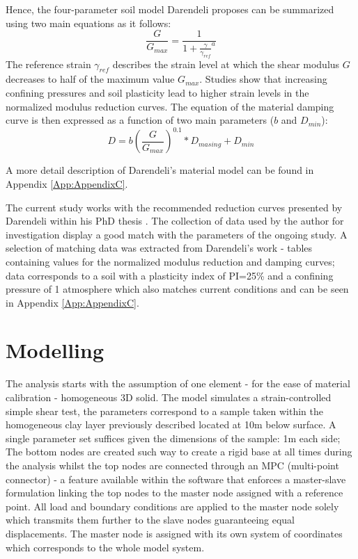 \documentclass[12pt,a4paper]{report}
\begin{document}
Hence, the four-parameter soil model Darendeli proposes can be summarized using two main equations as it follows:
\begin{equation}
	\frac{G}{G_{max}}=\frac{1}{1+{\frac{\gamma}{\gamma_{ref}}}^a}
\end{equation}
The reference strain $\gamma_{ref}$ describes the strain level at which the shear modulus $G$ decreases to half of the maximum value $G_{max}$. Studies show that increasing confining pressures and soil plasticity lead to higher strain levels in the normalized modulus reduction curves.
The equation of the material damping curve is then expressed as a function of two main parameters ($b$ and $D_{min}$):
\begin{equation}
	D=b(\frac{G}{G_{max}})^{0.1}*D_{masing}+D_{min}
\end{equation}

A more detail description of Darendeli's material model can be found in Appendix \ref{App:AppendixC}.

The current study works with the recommended reduction curves presented by Darendeli within his PhD thesis \cite{darendeli2001development}. The collection of data used by the author for investigation display a good match with the parameters of the ongoing study. A selection of matching data was extracted from Darendeli's work - tables containing values for the normalized modulus reduction and damping curves; data corresponds to a soil with a plasticity index of PI=25\% and a confining pressure of 1 atmosphere which also matches current conditions and can be seen in Appendix \ref{App:AppendixC}.

\section{Modelling}

The analysis starts with the assumption of one element - for the ease of material calibration - homogeneous 3D solid. The model simulates a strain-controlled simple shear test, the parameters correspond to a sample taken within the homogeneous clay layer previously described located at 10m below surface. A single parameter set suffices given the dimensions of the sample: 1m each side; The bottom nodes are created such way to create a rigid base at all times during the analysis whilst the top nodes are connected through an MPC (multi-point connector) - a feature available within the software that enforces a master-slave formulation linking the top nodes to the master node assigned with a reference point. All load and boundary conditions are applied to the master node solely which transmits them further to the slave nodes guaranteeing equal displacements. The master node is assigned with its own system of coordinates which corresponds to the whole model system.
\end{document}
